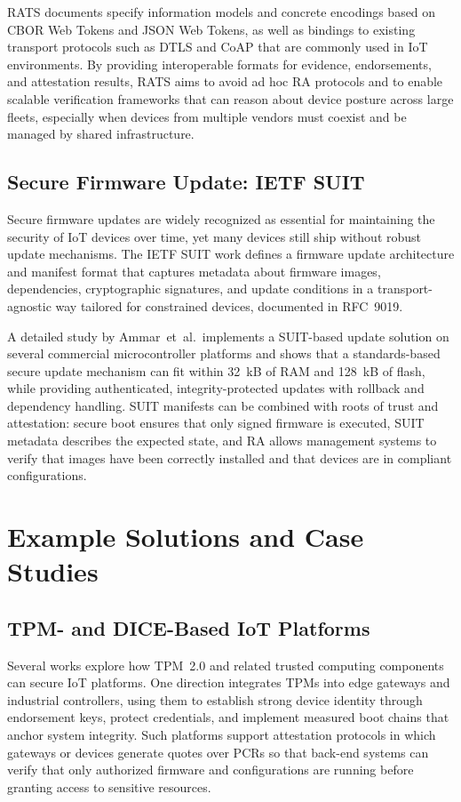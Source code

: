 \documentclass[conference,11pt,a4paper]{IEEEtran}
\begin{document}
RATS documents specify information models and concrete encodings based on CBOR Web Tokens and JSON Web Tokens, as well as bindings to existing transport protocols such as DTLS and CoAP that are commonly used in IoT environments.\cite{rats_arch,charra_pm} By providing interoperable formats for evidence, endorsements, and attestation results, RATS aims to avoid ad hoc RA protocols and to enable scalable verification frameworks that can reason about device posture across large fleets, especially when devices from multiple vendors must coexist and be managed by shared infrastructure.\cite{rats_arch,tcg_iot}

\subsection{Secure Firmware Update: IETF SUIT}
Secure firmware updates are widely recognized as essential for maintaining the security of IoT devices over time, yet many devices still ship without robust update mechanisms. The IETF SUIT work defines a firmware update architecture and manifest format that captures metadata about firmware images, dependencies, cryptographic signatures, and update conditions in a transport-agnostic way tailored for constrained devices, documented in RFC~9019.\cite{suit_arch}

A detailed study by Ammar~et~al.\ implements a SUIT-based update solution on several commercial microcontroller platforms and shows that a standards-based secure update mechanism can fit within 32~kB of RAM and 128~kB of flash, while providing authenticated, integrity-protected updates with rollback and dependency handling.\cite{suit_survey} SUIT manifests can be combined with roots of trust and attestation: secure boot ensures that only signed firmware is executed, SUIT metadata describes the expected state, and RA allows management systems to verify that images have been correctly installed and that devices are in compliant configurations.\cite{suit_arch,rats_arch}

\section{Example Solutions and Case Studies}

\subsection{TPM- and DICE-Based IoT Platforms}
Several works explore how TPM~2.0 and related trusted computing components can secure IoT platforms. One direction integrates TPMs into edge gateways and industrial controllers, using them to establish strong device identity through endorsement keys, protect credentials, and implement measured boot chains that anchor system integrity.\cite{tcg_tpm_iot,tcg_iot} Such platforms support attestation protocols in which gateways or devices generate quotes over PCRs so that back-end systems can verify that only authorized firmware and configurations are running before granting access to sensitive resources.
\end{document}
